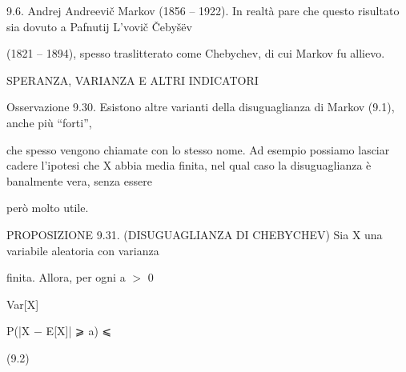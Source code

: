 \documentclass[a4paper,portrait,12pt]{article}
\begin{document}
\begin{flushleft}
9.6. Andrej Andreevi\v{c} Markov (1856 -- 1922). In realt\`{a} pare che questo risultato sia dovuto a Pafnutij L'vovi\v{c} \v{C}eby\v{s}\"{e}v
\end{flushleft}


\begin{flushleft}
(1821 -- 1894), spesso traslitterato come Chebychev, di cui Markov fu allievo.
\end{flushleft}










\begin{flushleft}
SPERANZA, VARIANZA E ALTRI INDICATORI
\end{flushleft}





\begin{flushleft}
Osservazione 9.30. Esistono altre varianti della disuguaglianza di Markov (9.1), anche più {``}forti'',
\end{flushleft}


\begin{flushleft}
che spesso vengono chiamate con lo stesso nome. Ad esempio possiamo lasciar cadere l'ipotesi che X abbia media finita, nel qual caso la disuguaglianza \`{e} banalmente vera, senza essere
\end{flushleft}


\begin{flushleft}
per\`{o} molto utile.
\end{flushleft}


\begin{flushleft}
PROPOSIZIONE 9.31. (DISUGUAGLIANZA DI CHEBYCHEV) Sia X una variabile aleatoria con varianza
\end{flushleft}


\begin{flushleft}
finita. Allora, per ogni a $>$ 0
\end{flushleft}


\begin{flushleft}
Var[X]
\end{flushleft}


\begin{flushleft}
P(|X $-$ E[X]| ⩾ a) ⩽
\end{flushleft}


(9.2)
\end{document}
